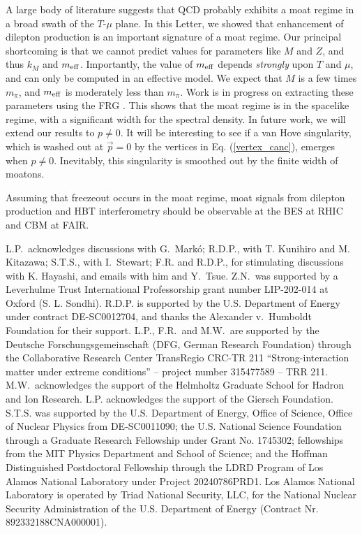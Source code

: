 \documentclass[twocolumn,prd,superscriptaddress, colorlinks, linkcolor=refcol, citecolor=refcol, urlcolor=refcol]{revtex4-2}
\begin{document}
A large body of literature suggests that 
QCD probably exhibits a moat regime in a broad swath
of the $T$-$\mu$ plane.
In this Letter, we showed that enhancement of dilepton production is an important signature of a moat regime.
Our principal shortcoming is that we cannot
predict values for parameters like $M$ and $Z$,
and thus $k_M$ and $m_{\rm eff}$.
Importantly, the value of $m_{\rm eff}$ depends
{\it strongly} upon $T$ and $\mu$, and can only be computed
in an effective model.
We expect that $M$ is a few times $m_\pi$, and $m_{\rm eff}$ is moderately less than $m_\pi$. Work is 
in progress on extracting these parameters using the FRG \cite{frg_moat}.  This shows that the moat regime is in the spacelike regime, with a significant width for the spectral density.  In future work, we will extend our results 
to $p \neq 0$.
It will be interesting to see if a van Hove singularity, which is washed out at $\vec{p} = 0$ by the vertices in Eq. (\ref{vertex_canc}), emerges when $p \neq 0$.
Inevitably, this singularity is smoothed out by the finite width of moatons.

Assuming that freezeout occurs in the moat regime, moat signals from dilepton production and HBT interferometry \cite{Pisarski:2021qof,Rennecke:2023xhc} 
should be observable at the BES at RHIC and CBM at FAIR.   

\acknowledgments
L.P.\ acknowledges discussions with G.\ Markó;
R.D.P., with T. Kunihiro and M. Kitazawa;
S.T.S.,  with I.\ Stewart; 
F.R. and R.D.P., for
stimulating discussions with K. Hayashi, 
and emails with him and Y.\ Tsue.
Z.N.\ was supported by a Leverhulme Trust International
Professorship grant number LIP-202-014 at Oxford (S. L. Sondhi). R.D.P. is supported by the U.S. Department of Energy under contract DE-SC0012704, and thanks the Alexander v.\ Humboldt
Foundation for their support.
L.P., F.R.\ and M.W.\ are supported by the Deutsche Forschungsgemeinschaft (DFG, German Research Foundation) through the Collaborative
Research Center TransRegio CRC-TR 211 “Strong-interaction matter under extreme conditions” – project number
315477589 – TRR 211.
M.W.\ acknowledges the support of the Helmholtz Graduate School for Hadron and Ion Research.
%
L.P. acknowledges the support of the Giersch Foundation.
S.T.S. was supported by the U.S. Department of Energy, Office of Science, Office of Nuclear Physics from DE-SC0011090; the U.S. National Science Foundation through a Graduate Research Fellowship under Grant No. 1745302; fellowships from the MIT Physics Department and School of Science; and the Hoffman Distinguished Postdoctoral Fellowship through the LDRD Program of Los Alamos National Laboratory under Project 20240786PRD1. Los Alamos National Laboratory is operated by Triad National Security, LLC, for the National Nuclear Security Administration of the U.S. Department of Energy (Contract Nr. 892332188CNA000001). 



\appendix

\hfill

 
\end{document}
